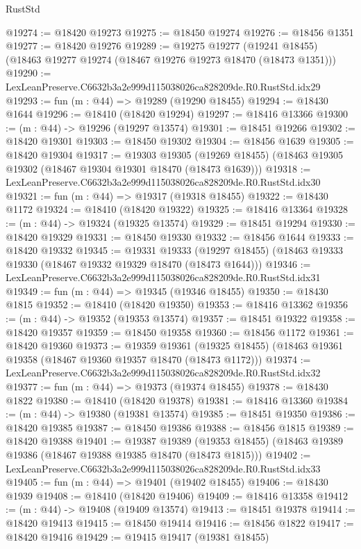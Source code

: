 \begin{lexlean}{RustStd}
\begin{coremodule}
@19274 := @18420 @19273
@19275 := @18450 @19274
@19276 := @18456 @1351
@19277 := @18420 @19276
@19289 := @19275
    @19277
    (@19241 @18455)
    (@18463 @19277 @19274 (@18467 @19276 @19273 @18470 (@18473 @1351)))
@19290 := LexLeanPreserve.C6632b3a2e999d115038026ca828209de.R0.RustStd.idx29
@19293 := fun (m : @44) => @19289 (@19290 @18455)
@19294 := @18430 @1644
@19296 := @18410 (@18420 @19294)
@19297 := @18416 @13366
@19300 := (m : @44) -> @19296 (@19297 @13574)
@19301 := @18451 @19266
@19302 := @18420 @19301
@19303 := @18450 @19302
@19304 := @18456 @1639
@19305 := @18420 @19304
@19317 := @19303
    @19305
    (@19269 @18455)
    (@18463 @19305 @19302 (@18467 @19304 @19301 @18470 (@18473 @1639)))
@19318 := LexLeanPreserve.C6632b3a2e999d115038026ca828209de.R0.RustStd.idx30
@19321 := fun (m : @44) => @19317 (@19318 @18455)
@19322 := @18430 @1172
@19324 := @18410 (@18420 @19322)
@19325 := @18416 @13364
@19328 := (m : @44) -> @19324 (@19325 @13574)
@19329 := @18451 @19294
@19330 := @18420 @19329
@19331 := @18450 @19330
@19332 := @18456 @1644
@19333 := @18420 @19332
@19345 := @19331
    @19333
    (@19297 @18455)
    (@18463 @19333 @19330 (@18467 @19332 @19329 @18470 (@18473 @1644)))
@19346 := LexLeanPreserve.C6632b3a2e999d115038026ca828209de.R0.RustStd.idx31
@19349 := fun (m : @44) => @19345 (@19346 @18455)
@19350 := @18430 @1815
@19352 := @18410 (@18420 @19350)
@19353 := @18416 @13362
@19356 := (m : @44) -> @19352 (@19353 @13574)
@19357 := @18451 @19322
@19358 := @18420 @19357
@19359 := @18450 @19358
@19360 := @18456 @1172
@19361 := @18420 @19360
@19373 := @19359
    @19361
    (@19325 @18455)
    (@18463 @19361 @19358 (@18467 @19360 @19357 @18470 (@18473 @1172)))
@19374 := LexLeanPreserve.C6632b3a2e999d115038026ca828209de.R0.RustStd.idx32
@19377 := fun (m : @44) => @19373 (@19374 @18455)
@19378 := @18430 @1822
@19380 := @18410 (@18420 @19378)
@19381 := @18416 @13360
@19384 := (m : @44) -> @19380 (@19381 @13574)
@19385 := @18451 @19350
@19386 := @18420 @19385
@19387 := @18450 @19386
@19388 := @18456 @1815
@19389 := @18420 @19388
@19401 := @19387
    @19389
    (@19353 @18455)
    (@18463 @19389 @19386 (@18467 @19388 @19385 @18470 (@18473 @1815)))
@19402 := LexLeanPreserve.C6632b3a2e999d115038026ca828209de.R0.RustStd.idx33
@19405 := fun (m : @44) => @19401 (@19402 @18455)
@19406 := @18430 @1939
@19408 := @18410 (@18420 @19406)
@19409 := @18416 @13358
@19412 := (m : @44) -> @19408 (@19409 @13574)
@19413 := @18451 @19378
@19414 := @18420 @19413
@19415 := @18450 @19414
@19416 := @18456 @1822
@19417 := @18420 @19416
@19429 := @19415
    @19417
    (@19381 @18455)

\end{coremodule}
\end{lexlean}
